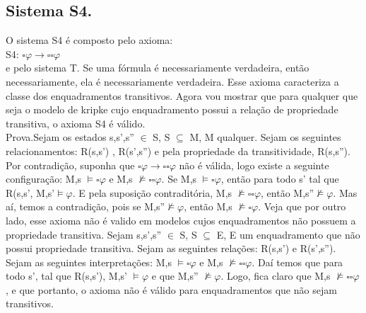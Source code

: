 \documentclass[12pt]{report}
\begin{document}
\subsection{Sistema S4.}
\hspace{0.5cm} O sistema S4 é composto pelo axioma:\\
S4: $\square \varphi \rightarrow \square \square \varphi  $ \\
e pelo sistema T. Se uma fórmula é necessariamente verdadeira, então necessariamente, ela é necessariamente verdadeira. Esse axioma caracteriza a classe dos enquadramentos transitivos. Agora vou mostrar que para qualquer que seja o modelo de kripke cujo enquadramento possui a relação de propriedade transitiva, o axioma S4 é válido.\\
Prova.Sejam os estados s,s',s'' $\in$ S, S $\subseteq $ M, M qualquer. Sejam os seguintes relacionamentos: R(s,s') , R(s',s'') e pela propriedade da transitividade, R(s,s''). Por contradição, suponha que $\square \varphi \rightarrow \square \square \varphi  $ não é válida, logo existe a seguinte configuração: M,s $\models \square \varphi $ e M,s $\nvDash \square \square \varphi $. Se M,s $\models \square \varphi $, então para todo s' tal que R(s,s', M,s'$\models \varphi $. E pela suposição contraditória, M,s $\nvDash \square \square \varphi $, então M,s''$\nvDash \varphi $. Mas aí, temos a contradição, pois se M,s''$\nvDash \varphi $, então M,s $\nvDash \square \varphi $. Veja que por outro lado, esse axioma não é valido em modelos cujos enquadramentos não possuem a propriedade transitiva. Sejam s,s',s'' $\in$ S, S $\subseteq $ E, E um enquadramento que não possui propriedade transitiva. Sejam as seguintes relações: R(s,s') e R(s',s''). Sejam as seguintes interpretações: M,s $\models \square \varphi $ e M,s $\nvDash \square \square \varphi $. Daí temos que para todo s', tal que R(s,s'), M,s' $\models \varphi $ e que M,s'' $\nvDash  \varphi $. Logo, fica claro que M,s $\nvDash \square \square \varphi $, e que portanto, o axioma não é válido para enquadramentos que não sejam transitivos.
\end{document}
